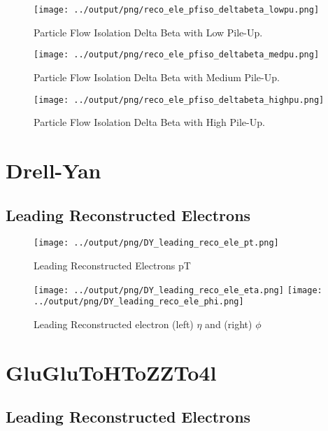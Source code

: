 \documentclass[11pt]{book}
\begin{document}
\begin{figure}[ht]
\centering
\texttt{[image: ../output/png/reco\_ele\_pfiso\_deltabeta\_lowpu.png]}
\caption{Particle Flow Isolation Delta Beta with Low Pile-Up.}
\label{fig:reco_ele_pfiso_deltabeta_lowpu}
\end{figure}

\begin{figure}[ht]
\centering
\texttt{[image: ../output/png/reco\_ele\_pfiso\_deltabeta\_medpu.png]}
\caption{Particle Flow Isolation Delta Beta with Medium Pile-Up.}
\label{fig:reco_ele_pfiso_deltabeta_medpu}
\end{figure}

\begin{figure}[ht]
\centering
\texttt{[image: ../output/png/reco\_ele\_pfiso\_deltabeta\_highpu.png]}
\caption{Particle Flow Isolation Delta Beta with High Pile-Up.}
\label{fig:reco_ele_pfiso_deltabeta_highpu}
\end{figure}
\clearpage

\chapter{Drell-Yan}
\section{Leading Reconstructed Electrons}

\begin{figure}[ht]
\centering
\texttt{[image: ../output/png/DY\_leading\_reco\_ele\_pt.png]}
\caption{Leading Reconstructed Electrons pT}
\label{fig:dy_leading_reco_ele_pt}
\end{figure}

\begin{figure}[ht]
\centering
\texttt{[image: ../output/png/DY\_leading\_reco\_ele\_eta.png]}
\texttt{[image: ../output/png/DY\_leading\_reco\_ele\_phi.png]}
\caption{Leading Reconstructed electron (left) $\eta$ and (right) $\phi$}
\label{fig:dy_leading_reco_ele_eta_phi}
\end{figure}
\clearpage

\chapter{GluGluToHToZZTo4l}
\section{Leading Reconstructed Electrons}
\end{document}
